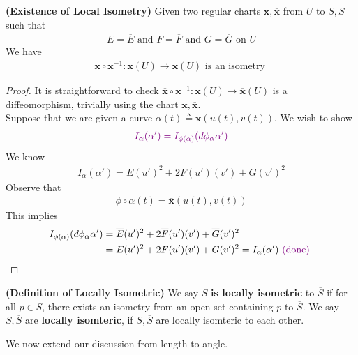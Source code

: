 \documentclass{report}
\begin{document}
\begin{theorem}
\textbf{(Existence of Local Isometry)} Given two regular charts $\textbf{x}, \overline{\textbf{x}}$ from $U$ to $S,\overline{S}$ such that 
\begin{align*}
E=\overline{E}\text{ and }F=\overline{F}\text{ and }G=\overline{G}\text{ on }U
\end{align*}
We have
\begin{align*}
\overline{\textbf{x}}\circ \textbf{x}^{-1}:\textbf{x}(U)\rightarrow \overline{\textbf{x}}(U)\text{ is an isometry }
\end{align*}
\end{theorem}
\begin{proof}
It is straightforward to check $\overline{\textbf{x}}\circ \textbf{x}^{-1}:\textbf{x}(U)\rightarrow \overline{\textbf{x}}(U)$ is a diffeomorphism, trivially using the chart $\textbf{x},\overline{\textbf{x}}$.\\

Suppose that we are given a curve $\alpha (t)\triangleq \textbf{x}(u(t),v(t))$. We wish to show 
 \begin{align*}
 \textcolor{violet}{I_\alpha (\alpha ')=I_{\phi (\alpha )}(d\phi_\alpha  \alpha ')}
\end{align*}
We know 
\begin{align*}
I_{\alpha }(\alpha ')=E (u')^2 + 2F(u')(v')+ G(v')^2
\end{align*}
Observe that 
\begin{align*}
\phi \circ \alpha (t)=\overline{\textbf{x}}(u(t),v(t))
\end{align*}
This implies 
\begin{align*}
I_{\phi (\alpha) }(d\phi_{\alpha }\alpha ')&=\overline{E}(u')^2 + 2\overline{F}(u')(v')+ \overline{G}(v')^2\\
&=E(u')^2+2F(u')(v')+G(v')^2=I_\alpha (\alpha ') \textcolor{violet}{\text{ (done) }}
\end{align*}
\end{proof}
\begin{definition}
\textbf{(Definition of Locally Isometric)} We say $S$  \textbf{is locally isometric} to $\overline{S}$ if for all $p\in S$, there exists an isometry from an open set containing  $p$ to  $\overline{S}$. We say $S,\overline{S}$ are \textbf{locally isomteric}, if $S,\overline{S}$ are locally isomteric to each other.
\end{definition}
\begin{mdframed}
We now extend our discussion from length to angle.
\end{mdframed}
\end{document}
